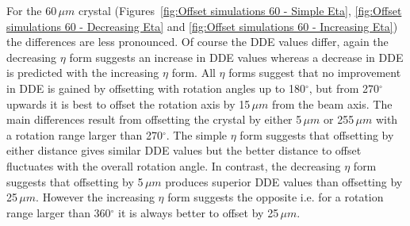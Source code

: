 For the 60$\,\mu m$ crystal (Figures~\ref{fig:Offset simulations 60 - Simple Eta}, \ref{fig:Offset simulations 60 - Decreasing Eta} and \ref{fig:Offset simulations 60 - Increasing Eta}) the differences are less pronounced.
Of course the DDE values differ, again the decreasing $\eta$ form suggests an increase in DDE values whereas a decrease in DDE is predicted with the increasing $\eta$ form.
All $\eta$ forms suggest that no improvement in DDE is gained by offsetting with rotation angles up to 180$^{\circ}$, but from 270$^{\circ}$ upwards it is best to offset the rotation axis by 15$\,\mu m$ from the beam axis.
The main differences result from offsetting the crystal by either 5$\,\mu m$ or 255$\,\mu m$ with a rotation range larger than 270$^{\circ}$.
The simple $\eta$ form suggests that offsetting by either distance gives similar DDE values but the better distance to offset fluctuates with the overall rotation angle.
In contrast, the decreasing $\eta$ form suggests that offsetting by 5$\,\mu m$ produces superior DDE values than offsetting by 25$\,\mu m$.
However the increasing $\eta$ form suggests the opposite i.e. for a rotation range larger than 360$^{\circ}$ it is always better to offset by 25$\,\mu m$.
